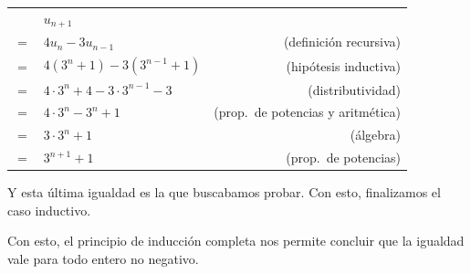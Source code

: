 \begin{enumerate}[(a)]
\begin{itemize}
                  \begin{tabular}{|l l r}
                     & $u_{n+1}$ & \\
                    $=$ & $4 u_n - 3 u_{n-1}$ & (definición recursiva) \\
                    $=$ & $4 (3^n + 1) - 3 (3^{n-1} + 1)$ & (hipótesis inductiva) \\
                    $=$ & $4 \cdot 3^n + 4 - 3 \cdot 3^{n-1} - 3$ & (distributividad) \\
                    $=$ & $4 \cdot 3^n - 3^n + 1$ & (prop.\ de potencias y aritmética) \\
                    $=$ & $3 \cdot 3^n + 1$ & (álgebra) \\
                    $=$ & $3^{n+1} + 1$ & (prop.\ de potencias) \\
                  \end{tabular}

                  Y esta última igualdad es la que buscabamos probar. Con esto, finalizamos el caso inductivo.
          \end{itemize}

          Con esto, el principio de inducción completa nos permite concluir que la igualdad vale para todo entero no negativo.
\end{enumerate}
